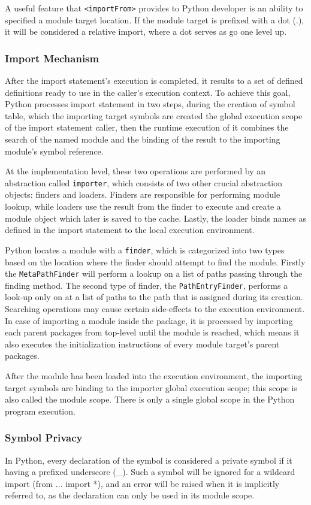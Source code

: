 A useful feature that \texttt{<importFrom>} provides to Python developer is an ability to specified a module target location. If the module target is prefixed with a dot (.), it will be considered a relative import, where a dot serves as go one level up.


\subsubsection{Import Mechanism}

After the import statement's execution is completed, it results to a set of defined definitions ready to use in the caller's execution context.
To achieve this goal, Python processes import statement in two steps, during the creation of symbol table, which the importing target symbols are created the global execution scope of the import statement caller, then the runtime execution of it combines the search of the named module and the binding of the result to the importing module's symbol reference.

At the implementation level, these two operations are performed by an abstraction called \texttt{importer}, which consists of two other crucial abstraction objects: finders and loaders.
Finders are responsible for performing module lookup, while loaders use the result from the finder to execute and create a module object which later is saved to the cache.
Lastly, the loader binds names as defined in the import statement to the local execution environment.

Python locates a module with a \texttt{finder}, which is categorized into two types based on the location where the finder should attempt to find the module.
Firstly the \texttt{MetaPathFinder} will perform a lookup on a list of paths passing through the finding method.
The second type of finder, the \texttt{PathEntryFinder}, performs a look-up only on at a list of paths to the path that is assigned during its creation.
Searching operations may cause certain side-effects to the execution environment. In case of importing a module inside the package, it is processed by importing each parent packages from top-level until the module is reached, which means it also executes the initialization instructions of every module target's parent packages.

After the module has been loaded into the execution environment, the importing target symbols are binding to the importer global execution scope; this scope is also called the module scope. There is only a single global scope in the Python program execution.

\subsubsection{Symbol Privacy}

In Python, every declaration of the symbol is considered a private symbol if it having a prefixed underscore (\_). Such a symbol will be ignored for a wildcard import (from ... import *), and an error will be raised when it is implicitly referred to, as the declaration can only be used in its module scope.
